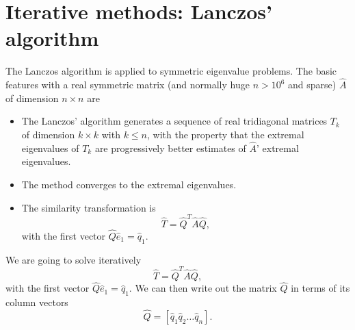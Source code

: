 \section{Iterative methods: Lanczos' algorithm}
The Lanczos algorithm is applied to symmetric eigenvalue problems.
The basic features with a real symmetric matrix (and normally huge $n> 10^6$ and sparse) 
$\hat{A}$ of dimension $n\times n$ are
\begin{itemize}
\item The  Lanczos' algorithm generates a sequence of real tridiagonal matrices $T_k$ of dimension $k\times k$ with $k\le n$, with the property that the extremal eigenvalues of $T_k$ are progressively better estimates of $\hat{A}$' extremal eigenvalues.
\item The method converges to the extremal eigenvalues.
\item The similarity transformation is 
\[
\hat{T}= \hat{Q}^{T}\hat{A}\hat{Q},
\]
with the first vector $\hat{Q}\hat{e}_1=\hat{q}_1$.
\end{itemize}
We are going to solve iteratively
\[
\hat{T}= \hat{Q}^{T}\hat{A}\hat{Q},
\]
with the first vector $\hat{Q}\hat{e}_1=\hat{q}_1$.
We can then write out the matrix $\hat{Q}$ in terms of its column vectors 
\[
\hat{Q}=\left[\hat{q}_1\hat{q}_2\dots\hat{q}_n\right].
\]

